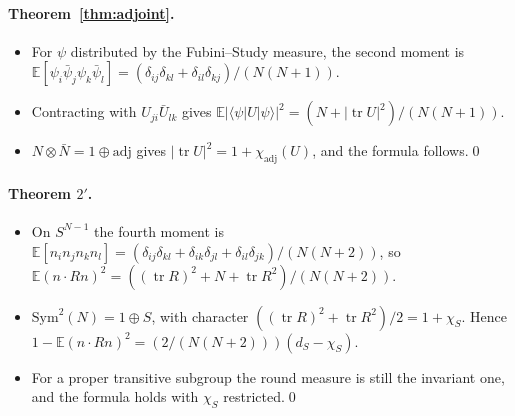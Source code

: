 \documentclass[11pt,a4paper]{article}
\theoremstyle{plain}
\theoremstyle{definition}
\theoremstyle{remark}
\newcommand{\tr}{\operatorname{tr}}
\newcommand{\E}{\mathbb{E}}
\newcommand{\adj}{\mathrm{adj}}
\newcommand{\Sym}{\mathrm{Sym}}
\begin{document}
\paragraph{Theorem~\ref{thm:adjoint}.}
\begin{itemize}[leftmargin=2em, itemsep=3pt]
\item For $\psi$ distributed by the Fubini--Study measure, the second moment is $\E[\psi_i\bar\psi_j\psi_k\bar\psi_l]=(\delta_{ij}\delta_{kl}+\delta_{il}\delta_{kj})/(N(N+1))$.
\item Contracting with $U_{ji}\bar U_{lk}$ gives $\E|\langle\psi|U|\psi\rangle|^2=(N+|\tr U|^2)/(N(N+1))$.
\item $N\otimes\bar N=1\oplus\adj$ gives $|\tr U|^2=1+\chi_{\adj}(U)$, and the formula follows.\qed
\end{itemize}

\paragraph{Theorem $2'$.}
\begin{itemize}[leftmargin=2em, itemsep=3pt]
\item On $S^{N-1}$ the fourth moment is $\E[n_in_jn_kn_l]=(\delta_{ij}\delta_{kl}+\delta_{ik}\delta_{jl}+\delta_{il}\delta_{jk})/(N(N+2))$, so $\E(n\cdot Rn)^2=((\tr R)^2+N+\tr R^2)/(N(N+2))$.
\item $\Sym^2(N)=1\oplus S$, with character $((\tr R)^2+\tr R^2)/2=1+\chi_S$. Hence $1-\E(n\cdot Rn)^2=(2/(N(N+2)))(d_S-\chi_S)$.
\item For a proper transitive subgroup the round measure is still the invariant one, and the formula holds with $\chi_S$ restricted.\qed
\end{itemize}
\end{document}
